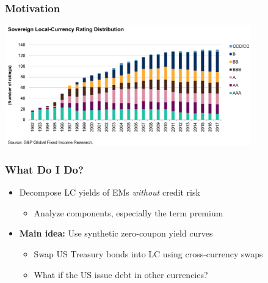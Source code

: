 \documentclass[12pt, xcolor=dvipsnames]{beamer} 			         %
\begin{document}
\begin{frame}
\frametitle{Motivation}
\begin{center}
	\includegraphics[width=0.8\textwidth,height=0.7\textheight]{../Figures/Sovereign_LC_Rating_Dist.png}
\end{center}
\end{frame}

\begin{frame}
	\frametitle{What Do I Do?}
	\begin{itemize}
		\item Decompose LC yields of EMs \textit{without} credit risk
		\begin{itemize}
			\item Analyze components, especially the term premium
		\end{itemize}
		\pause
		\item \textbf{Main idea:} Use synthetic zero-coupon yield curves
		\begin{itemize}
			\item Swap US Treasury bonds into LC using cross-currency swaps
			\item What if the US issue debt in other currencies?
		\end{itemize}
	\end{itemize}
\end{frame}
\end{document}
